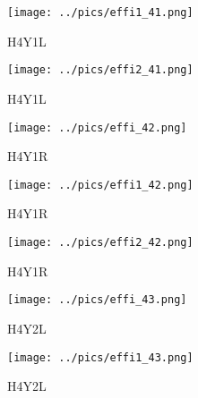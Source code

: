 \documentclass[10pt, xcolor={dvipsnames}, aspectratio = 169]{beamer}
\begin{document}
\begin{frame}

\begin{figure}
\centering
\texttt{[image: ../pics/effi1\_41.png]}
\caption{H4Y1L}
\end{figure}

\end{frame}


\begin{frame}

\begin{figure}
\centering
\texttt{[image: ../pics/effi2\_41.png]}
\caption{H4Y1L}
\end{figure}

\end{frame}

\begin{frame}

\begin{figure}
\centering
\texttt{[image: ../pics/effi\_42.png]}
\caption{H4Y1R}
\end{figure}

\end{frame}

\begin{frame}

\begin{figure}
\centering
\texttt{[image: ../pics/effi1\_42.png]}
\caption{H4Y1R}
\end{figure}

\end{frame}

\begin{frame}

\begin{figure}
\centering
\texttt{[image: ../pics/effi2\_42.png]}
\caption{H4Y1R}
\end{figure}

\end{frame}

\begin{frame}

\begin{figure}
\centering
\texttt{[image: ../pics/effi\_43.png]}
\caption{H4Y2L}
\end{figure}

\end{frame}

\begin{frame}

\begin{figure}
\centering
\texttt{[image: ../pics/effi1\_43.png]}
\caption{H4Y2L}
\end{figure}

\end{frame}
\end{document}
